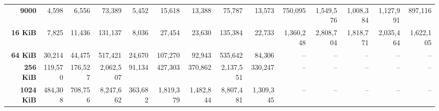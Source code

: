 \begin{table}[!htbp]
{\begin{tabular}{@{}>{\bfseries}r rrrr rrrr rrrrr@{}}
9000 & 4{,}598 & 6{,}556 & 73{,}389 & 5{,}452 & 15{,}618 & 13{,}388 & 75{,}787 & 13{,}573 & 750{,}095 & 1{,}549{,}576 & 1{,}008{,}384 & 1{,}127{,}991 & 897{,}116 \\
16 KiB & 7{,}825 & 11{,}436 & 131{,}137 & 8{,}036 & 27{,}454 & 23{,}630 & 135{,}384 & 22{,}733 & 1{,}360{,}248 & 2{,}808{,}704 & 1{,}818{,}771 & 2{,}035{,}464 & 1{,}622{,}105 \\
64 KiB & 30{,}214 & 44{,}475 & 517{,}421 & 24{,}670 & 107{,}270 & 92{,}943 & 535{,}642 & 84{,}306 & -- & -- & -- & -- & -- \\
256 KiB & 119{,}570 & 176{,}527 & 2{,}062{,}507 & 91{,}134 & 427{,}303 & 370{,}862 & 2{,}137{,}551 & 330{,}247 & -- & -- & -- & -- & -- \\
1024 KiB & 484{,}308 & 708{,}756 & 8{,}247{,}662 & 363{,}682 & 1{,}819{,}379 & 1{,}482{,}844 & 8{,}807{,}481 & 1{,}309{,}345 & -- & -- & -- & -- & -- \\
\bottomrule
\end{tabular}}
\end{table}
